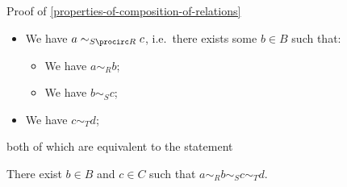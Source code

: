 \begin{Proof}{Proof of \cref{properties-of-composition-of-relations}}
\begin{enumerate}
            \begin{itemize}
                \item We have $a\sim_{S\procirc R}c$, i.e.\ there exists some $b\in B$ such that:
                    \begin{itemize}
                        \item We have $a\sim_{R}b$;
                        \item We have $b\sim_{S}c$;
                    \end{itemize}
                \item We have $c\sim_{T}d$;
            \end{itemize}
    \end{enumerate}
    both of which are equivalent to the statement
    \begin{itemize}
        \itemstar There exist $b\in B$ and $c\in C$ such that $a\sim_{R}b\sim_{S}c\sim_{T}d$.
    \end{itemize}


\end{Proof}
